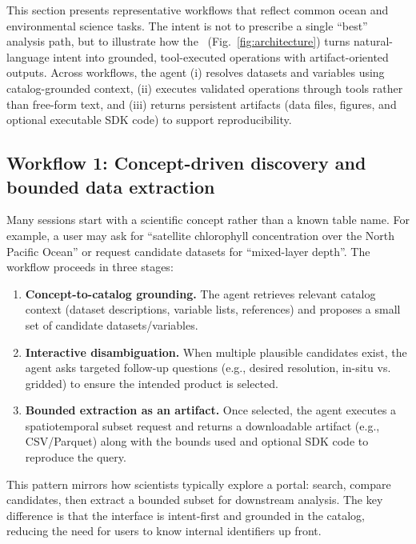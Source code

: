This section presents representative workflows that reflect common ocean and environmental science tasks.
The intent is not to prescribe a single ``best'' analysis path, but to illustrate how the \cmapagent\ (Fig.~\ref{fig:architecture}) turns natural-language intent into grounded, tool-executed operations with artifact-oriented outputs.
Across workflows, the agent (i) resolves datasets and variables using catalog-grounded context, (ii) executes validated operations through tools rather than free-form text, and (iii) returns persistent artifacts (data files, figures, and optional executable SDK code) to support reproducibility.

\subsection{Workflow 1: Concept-driven discovery and bounded data extraction}
Many sessions start with a scientific concept rather than a known table name.
For example, a user may ask for ``satellite chlorophyll concentration over the North Pacific Ocean'' or request candidate datasets for ``mixed-layer depth''.
The workflow proceeds in three stages:
\begin{enumerate}[leftmargin=*]
  \item \textbf{Concept-to-catalog grounding.} The agent retrieves relevant catalog context (dataset descriptions, variable lists, references) and proposes a small set of candidate datasets/variables.
  \item \textbf{Interactive disambiguation.} When multiple plausible candidates exist, the agent asks targeted follow-up questions (e.g., desired resolution, in-situ vs. gridded) to ensure the intended product is selected.
  \item \textbf{Bounded extraction as an artifact.} Once selected, the agent executes a spatiotemporal subset request and returns a downloadable artifact (e.g., CSV/Parquet) along with the bounds used and optional SDK code to reproduce the query.
\end{enumerate}
This pattern mirrors how scientists typically explore a portal: search, compare candidates, then extract a bounded subset for downstream analysis.
The key difference is that the interface is intent-first and grounded in the catalog, reducing the need for users to know internal identifiers up front.

